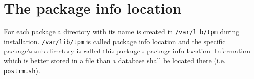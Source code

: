 \documentclass[a4paper]{article}
\newcommand{\file}[1]{\texttt{#1}}
\begin{document}
	\section{The package info location}
	\label{sec:the_package_info_location}
	
	For each package a directory with its name is created in \file{/var/lib/tpm} during installation. \file{/var/lib/tpm} is called package info location and the specific package's sub directory is called this package's package info location. Information which is better stored in a file than a database shall be located there (i.e. \file{postrm.sh}).
\end{document}
